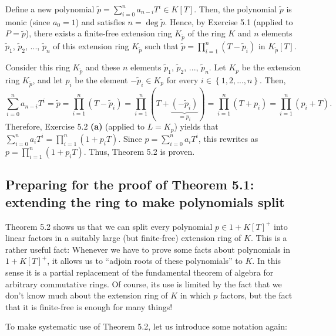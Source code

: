 \documentclass[numbers=enddot,12pt,final,onecolumn,notitlepage]{scrartcl}%
\begin{document}
Define a new polynomial $\widetilde{p}=\sum\limits_{i=0}^{n}a_{n-i}T^{i}\in
K\left[  T\right]  $. Then, the polynomial $\widetilde{p}$ is monic (since
$a_{0}=1$) and satisfies $n=\deg\widetilde{p}$. Hence, by Exercise 5.1
(applied to $P=\widetilde{p}$), there exists a finite-free extension ring
$K_{\widetilde{p}}$ of the ring $K$ and $n$ elements $\widetilde{p}_{1}$,
$\widetilde{p}_{2}$, $...$, $\widetilde{p}_{n}$ of this extension ring
$K_{\widetilde{p}}$ such that $\widetilde{p}=\prod\limits_{i=1}^{n}\left(
T-\widetilde{p}_{i}\right)  $ in $K_{\widetilde{p}}\left[  T\right]  $.

Consider this ring $K_{\widetilde{p}}$ and these $n$ elements $\widetilde{p}%
_{1}$, $\widetilde{p}_{2}$, $...$, $\widetilde{p}_{n}$. Let $K_{p}$ be the
extension ring $K_{\widetilde{p}}$, and let $p_{i}$ be the element
$-\widetilde{p}_{i}\in K_{p}$ for every $i\in\left\{  1,2,...,n\right\}  $.
Then,
\[
\sum\limits_{i=0}^{n}a_{n-i}T^{i}=\widetilde{p}=\prod\limits_{i=1}^{n}\left(
T-\widetilde{p}_{i}\right)  =\prod\limits_{i=1}^{n}\left(
T+\underbrace{\left(  -\widetilde{p}_{i}\right)  }_{=p_{i}}\right)
=\prod\limits_{i=1}^{n}\left(  T+p_{i}\right)  =\prod\limits_{i=1}^{n}\left(
p_{i}+T\right)  .
\]
Therefore, Exercise 5.2 \textbf{(a)} (applied to $L=K_{p}$) yields that
$\sum\limits_{i=0}^{n}a_{i}T^{i}=\prod\limits_{i=1}^{n}\left(  1+p_{i}%
T\right)  $. Since $p=\sum\limits_{i=0}^{n}a_{i}T^{i}$, this rewrites as
$p=\prod\limits_{i=1}^{n}\left(  1+p_{i}T\right)  $. Thus, Theorem 5.2 is proven.

\subsection{Preparing for the proof of Theorem 5.1: extending the ring to make
polynomials split}

Theorem 5.2 shows us that we can split every polynomial $p\in1+K\left[
T\right]  ^{+}$ into linear factors in a suitably large (but finite-free)
extension ring of $K$. This is a rather useful fact: Whenever we have to prove
some facts about polynomials in $1+K\left[  T\right]  ^{+}$, it allows us to
``adjoin roots of these polynomials'' to $K$. In this sense it is a partial
replacement of the fundamental theorem of algebra for arbitrary commutative
rings. Of course, its use is limited by the fact that we don't know much about
the extension ring of $K$ in which $p$ factors, but the fact that it is
finite-free is enough for many things!

To make systematic use of Theorem 5.2, let us introduce some notation again:
\end{document}
